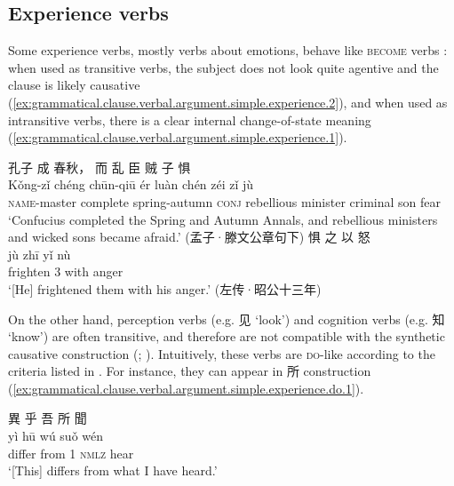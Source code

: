 \documentclass[UTF8, a4paper, oneside, scheme=plain, 12pt]{ctexrep}
\newcommand*{\citepage}[1]{p.~{#1}}
\newcommand{\translate}[1]{`#1'}
\newcommand*{\category}[1]{\textsc{#1}}
\begin{document}
\subsection{Experience verbs}
\label{sec:grammatical.clause.verbal.argument.simple.experience}
Some experience verbs, mostly verbs about emotions, behave like \category{become} verbs
\citep[\citepage{273}]{meiguang2018}:
when used as transitive verbs,
the subject does not look quite agentive and the clause is likely causative
(\ref{ex:grammatical.clause.verbal.argument.simple.experience.2}),
and when used as intransitive verbs,
there is a clear internal change-of-state meaning
(\ref{ex:grammatical.clause.verbal.argument.simple.experience.1}).

\begin{exe}
    \ex\label{ex:grammatical.clause.verbal.argument.simple.experience.1}
    \glll 孔子 成 春秋， 而 乱 臣 贼 子 惧 \\
    Kǒng-zǐ chéng chūn-qiū ér luàn chén zéi zǐ jù \\
    \category{name}-master complete spring-autumn \category{conj} rebellious minister criminal son fear \\
    \glt\translate{Confucius completed the Spring and Autumn Annals, and rebellious ministers and wicked sons became afraid.} \hfill (孟子·滕文公章句下)
    \ex\label{ex:grammatical.clause.verbal.argument.simple.experience.2}
    \glll 惧 之 以 怒 \\
    jù zhī yǐ nù \\
    frighten 3 with anger \\
    \glt\translate{[He] frightened them with his anger.} \hfill (左传·昭公十三年)
\end{exe}

On the other hand, perception verbs (e.g. 见 \translate{look}) and cognition verbs (e.g. 知 \translate{know})
are often transitive,
and therefore are not compatible with the synthetic causative construction 
(;
\citealt[\citepage{274}]{meiguang2018}).
Intuitively, these verbs are \category{do}-like according to the criteria listed in .
For instance, they can appear in 所 construction
(\ref{ex:grammatical.clause.verbal.argument.simple.experience.do.1}).

\begin{exe}
    \ex\label{ex:grammatical.clause.verbal.argument.simple.experience.do.1}
    \glll 異 乎 吾 所 聞 \\
    yì hū wú suǒ wén \\
    differ from 1 \category{nmlz} hear \\
    \glt\translate{[This] differs from what I have heard.}
\end{exe}
\end{document}
